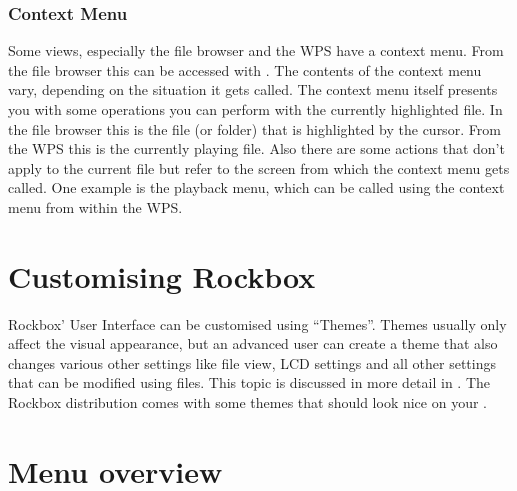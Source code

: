 \subsubsection{Context Menu}
Some views, especially the file browser and the WPS have a context menu.
From the file browser this can be accessed with \ActionStdContext{}.
The contents of the context menu vary, depending on the situation it gets
called. The context menu itself presents you with some operations you can
perform with the currently highlighted file. In the file browser this is
the file (or folder) that is highlighted by the cursor. From the WPS this is
the currently playing file. Also there are some actions that don't apply
to the current file but refer to the screen from which the context menu
gets called. One example is the playback menu, which can be called using
the context menu from within the WPS.

\section{Customising Rockbox}
Rockbox' User Interface can be customised using ``Themes''. Themes usually
only affect the visual appearance, but an advanced user can create a theme
that also changes various other settings like file view, LCD settings and
all other settings that can be modified using  files. This topic
is discussed in more detail in .
The Rockbox distribution comes with some themes that should look nice on
your \dap{}. 

\section{Menu overview}
%


